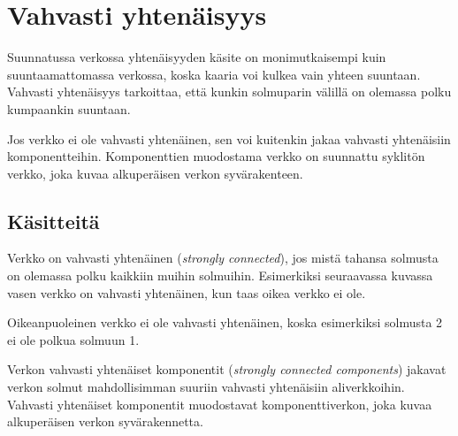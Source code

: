 \chapter{Vahvasti yhtenäisyys}

Suunnatussa verkossa yhtenäisyyden
käsite on monimutkaisempi
kuin suuntaamattomassa verkossa,
koska kaaria voi kulkea vain yhteen suuntaan.
Vahvasti yhtenäisyys tarkoittaa,
että kunkin solmuparin välillä on
olemassa polku kumpaankin suuntaan.

Jos verkko ei ole vahvasti yhtenäinen,
sen voi kuitenkin jakaa vahvasti yhtenäisiin
komponentteihin. Komponenttien muodostama
verkko on suunnattu syklitön verkko,
joka kuvaa alkuperäisen verkon syvärakenteen.

\section{Käsitteitä}

Verkko on vahvasti yhtenäinen
(\textit{strongly connected}),
jos mistä tahansa solmusta on olemassa polku
kaikkiin muihin solmuihin.
Esimerkiksi seuraavassa kuvassa vasen
verkko on vahvasti yhtenäinen,
kun taas oikea verkko ei ole.
\\
\begin{center}
\end{center}

Oikeanpuoleinen verkko ei ole vahvasti yhtenäinen,
koska esimerkiksi solmusta 2 ei ole
polkua solmuun 1.

Verkon vahvasti yhtenäiset komponentit
(\textit{strongly connected components})
jakavat verkon solmut mahdollisimman
suuriin vahvasti yhtenäisiin aliverkkoihin.
Vahvasti yhtenäiset komponentit
muodostavat komponenttiverkon,
joka kuvaa alkuperäisen verkon syvärakennetta.

